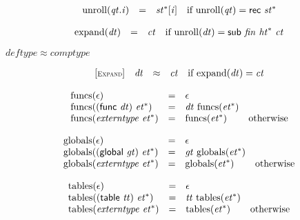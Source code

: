 $$
\begin{array}{@{}lcl@{}l@{}}
{\mathrm{unroll}}({\mathit{qt}} . {\mathit{i}}) &=& {{\mathit{st}}^\ast}[{\mathit{i}}] &\quad
  \mbox{if}~{\mathrm{unroll}}({\mathit{qt}}) = \mathsf{rec}~{{\mathit{st}}^\ast} \\
\end{array}
$$

$$
\begin{array}{@{}lcl@{}l@{}}
{\mathrm{expand}}({\mathit{dt}}) &=& {\mathit{ct}} &\quad
  \mbox{if}~{\mathrm{unroll}}({\mathit{dt}}) = \mathsf{sub}~{\mathit{fin}}~{{\mathit{ht}}^\ast}~{\mathit{ct}} \\
\end{array}
$$

$\boxed{{\mathit{deftype}} \approx {\mathit{comptype}}}$

$$
\begin{array}{@{}l@{}lcl@{}l@{}}
{[\textsc{\scriptsize Expand}]} \quad & {\mathit{dt}} &\approx& {\mathit{ct}} &\quad
  \mbox{if}~{\mathrm{expand}}({\mathit{dt}}) = {\mathit{ct}} \\
\end{array}
$$

\vspace{1ex}

$$
\begin{array}{@{}lcl@{}l@{}}
{\mathrm{funcs}}(\epsilon) &=& \epsilon &  \\
{\mathrm{funcs}}((\mathsf{func}~{\mathit{dt}})~{{\mathit{et}}^\ast}) &=& {\mathit{dt}}~{\mathrm{funcs}}({{\mathit{et}}^\ast}) &  \\
{\mathrm{funcs}}({\mathit{externtype}}~{{\mathit{et}}^\ast}) &=& {\mathrm{funcs}}({{\mathit{et}}^\ast}) &\quad
  \mbox{otherwise} \\
\end{array}
$$

$$
\begin{array}{@{}lcl@{}l@{}}
{\mathrm{globals}}(\epsilon) &=& \epsilon &  \\
{\mathrm{globals}}((\mathsf{global}~{\mathit{gt}})~{{\mathit{et}}^\ast}) &=& {\mathit{gt}}~{\mathrm{globals}}({{\mathit{et}}^\ast}) &  \\
{\mathrm{globals}}({\mathit{externtype}}~{{\mathit{et}}^\ast}) &=& {\mathrm{globals}}({{\mathit{et}}^\ast}) &\quad
  \mbox{otherwise} \\
\end{array}
$$

$$
\begin{array}{@{}lcl@{}l@{}}
{\mathrm{tables}}(\epsilon) &=& \epsilon &  \\
{\mathrm{tables}}((\mathsf{table}~{\mathit{tt}})~{{\mathit{et}}^\ast}) &=& {\mathit{tt}}~{\mathrm{tables}}({{\mathit{et}}^\ast}) &  \\
{\mathrm{tables}}({\mathit{externtype}}~{{\mathit{et}}^\ast}) &=& {\mathrm{tables}}({{\mathit{et}}^\ast}) &\quad
  \mbox{otherwise} \\
\end{array}
$$

